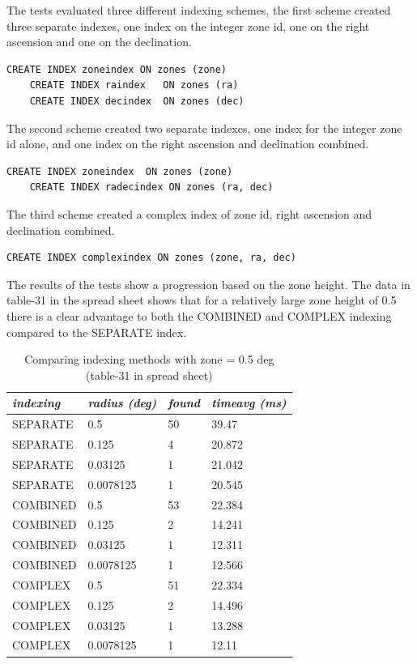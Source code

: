 \documentclass{article}
\begin{document}
The tests evaluated three different indexing schemes, the first scheme created three separate indexes, one index on the integer zone id, one on the right ascension and one on the declination.

\begin{lstlisting}[style=SQL]
    CREATE INDEX zoneindex ON zones (zone)
    CREATE INDEX raindex   ON zones (ra)
    CREATE INDEX decindex  ON zones (dec)
\end{lstlisting}

The second scheme created two separate indexes, one index for the integer zone id alone, and one index on the right ascension and declination combined.

\begin{lstlisting}[style=SQL]
    CREATE INDEX zoneindex  ON zones (zone)
    CREATE INDEX radecindex ON zones (ra, dec)
\end{lstlisting}

The third scheme created a complex index of zone id, right ascension and declination combined.

\begin{lstlisting}[style=SQL]
    CREATE INDEX complexindex ON zones (zone, ra, dec)
\end{lstlisting}

The results of the tests show a progression based on the zone height. The data in table-31 in the spread sheet shows that for a relatively large zone height of 0.5 there is a clear advantage to both the COMBINED and COMPLEX indexing compared to the SEPARATE index.

\begin{table}[hbt!]
\centering
\begin{tabular}{|l|l|l|l|}
\hline
\textit{indexing} & \textit{radius (deg)} & \textit{found} & \textit{timeavg (ms)} \\ \hline
SEPARATE & 0.5 & 50 & 39.47 \\ \hline
SEPARATE & 0.125 & 4 & 20.872 \\ \hline
SEPARATE & 0.03125 & 1 & 21.042 \\ \hline
SEPARATE & 0.0078125 & 1 & 20.545 \\ \hline
COMBINED & 0.5 & 53 & 22.384 \\ \hline
COMBINED & 0.125 & 2 & 14.241 \\ \hline
COMBINED & 0.03125 & 1 & 12.311 \\ \hline
COMBINED & 0.0078125 & 1 & 12.566 \\ \hline
COMPLEX  & 0.5 & 51 & 22.334 \\ \hline
COMPLEX  & 0.125 & 2 & 14.496 \\ \hline
COMPLEX  & 0.03125 & 1 & 13.288 \\ \hline
COMPLEX  & 0.0078125 & 1 & 12.11 \\ \hline
\end{tabular}
\caption{Comparing indexing methods with zone = 0.5 deg (table-31 in spread sheet)}
\label{tab:indexing-large-zone}
\end{table}
\end{document}
